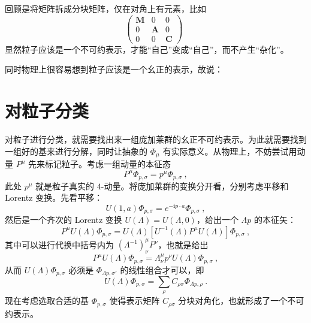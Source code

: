 回顾是将矩阵拆成分块矩阵，仅在对角上有元素，比如
\begin{equation}
	\left(
	\begin{matrix}
		\textbf{M} & 0 & 0 \\
		0 & \textbf{A} & 0 \\
		0 & 0 & \textbf{C} 
	\end{matrix}\right ) ~~
\end{equation}
显然粒子应该是一个不可约表示，才能“自己”变成“自己”，而不产生“杂化”。

同时物理上很容易想到粒子应该是一个幺正的表示，故说：
\begin{center}
\end{center}

\section{对粒子分类}
对粒子进行分类，就需要找出来一组庞加莱群的幺正不可约表示。为此就需要找到一组好的基来进行分解，同时让抽象的 $\Phi_\mu$ 有实际意义。从物理上，不妨尝试用动量 $P^\mu$ 先来标记粒子。考虑一组动量的本征态 
\begin{equation}
	P^\mu \Phi_{p, \sigma} = p^\mu \Phi_{p, \sigma} ~,
\end{equation}
此处 $p^\mu$ 就是粒子真实的 $4$-动量。将庞加莱群的变换分开看，分别考虑平移和 Lorentz 变换。先看平移：
\begin{equation}
	U(1, a) \Phi_{p, \sigma} = e^{-\mathbf{i} p \cdot a} \Phi_{p, \sigma} ~,
\end{equation}
然后是一个齐次的 Lorentz 变换 $U(\Lambda) = U(\Lambda, 0)$，给出一个 $\Lambda p$ 的本征矢：
\begin{equation}
	P^\mu U(\Lambda) \Phi_{p, \sigma} = U(\Lambda) [U^{-1}(\Lambda) P^\mu U(\Lambda)] \Phi_{p, \sigma} ~, 
\end{equation}
其中可以进行代换中括号内为 $(\Lambda^{-1})^\mu_{\nu} P^\nu$，也就是给出 
\begin{equation}
	P^\mu U(\Lambda) \Phi_{p, \sigma} = \Lambda_\nu^\mu p^\nu U(\Lambda) \Phi_{p, \sigma} ~,
\end{equation}
从而 $U(\Lambda) \Phi_{p, \sigma}$ 必须是 $\Phi_{\Lambda p, \sigma'}$ 的线性组合才可以，即 
\begin{equation}
	U(\Lambda) \Phi_{p, \sigma} = \sum_{\rho} C_{\rho \sigma} \Phi_{\Lambda p, \rho} ~.
\end{equation}
现在考虑选取合适的基 $\Phi_{p, \sigma}$ 使得表示矩阵 $C_{\rho \sigma}$ 分块对角化，也就形成了一个不可约表示。

